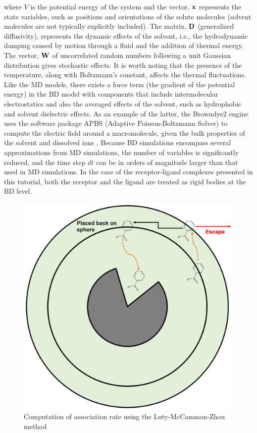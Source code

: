 \documentclass[9pt,training,pubversion]{livecoms}
\begin{document}
\noindent where $V$ is the potential energy of the system and the vector, ${\bf x}$ represents the state variables, such as positions and orientations of the solute molecules (solvent molecules are not typically explicitly included). The matrix, ${\bf D}$ (generalized diffusivity), represents the dynamic effects of the solvent, i.e., the hydrodynamic damping caused by motion through a fluid and the addition of thermal energy. The vector, ${\bf W}$ of uncorrelated random numbers following a unit Gaussian distribution gives stochastic effects. It is worth noting that the presence of the temperature, along with Boltzmann's constant, affects the thermal fluctuations. Like the MD models, there exists a force term (the gradient of the potential energy) in the BD model with components that include intermolecular electrostatics and also the averaged effects of the solvent, such as hydrophobic and solvent dielectric effects. As an example of the latter, the Browndye2 engine uses the software package APBS (Adaptive Poisson-Boltzmann Solver) to compute the electric field around a macromolecule, given the bulk properties of the solvent and dissolved ions \cite{jurrus2018improvements}. Because BD simulations encompass several approximations from  MD simulations, the number of variables is significantly reduced, and the time step $dt$ can be in orders of magnitude larger than that used in MD simulations. In the case of the receptor-ligand complexes presented in this tutorial, both the receptor and the ligand are treated as rigid bodies at the BD level. \par

\begin{figure}
\centering
\includegraphics[scale=0.48]{images/figure1.png}
\caption{Computation of association rate using the Luty-McCammon-Zhou method}
\label{figure1}
\end{figure}
\end{document}
